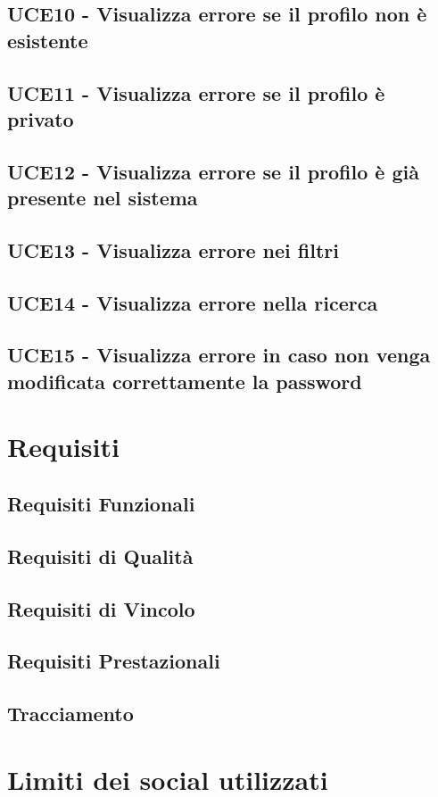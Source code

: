 \documentclass[a4paper]{article}
\begin{document}
	\subsection{UCE10 - Visualizza errore se il profilo non è esistente}
	
	
	\subsection{UCE11 - Visualizza errore se il profilo è privato}
	
	
	\subsection{UCE12 - Visualizza errore se il profilo è già presente nel sistema}
	
	
	\subsection{UCE13 - Visualizza errore nei filtri}
	
	
	\subsection{UCE14 - Visualizza errore nella ricerca}
	
	
	\subsection{UCE15 - Visualizza errore in caso non venga modificata correttamente la password}
	

	\newpage	
	
	\section{Requisiti}
	
	
	\subsection{Requisiti Funzionali}
	
	
	\subsection{Requisiti di Qualità}
	
	
	\subsection{Requisiti di Vincolo}
	
	
	\subsection{Requisiti Prestazionali}
		
	
	\subsection{Tracciamento}
		

	\section{Limiti dei social utilizzati}
	
	
\end{document}
